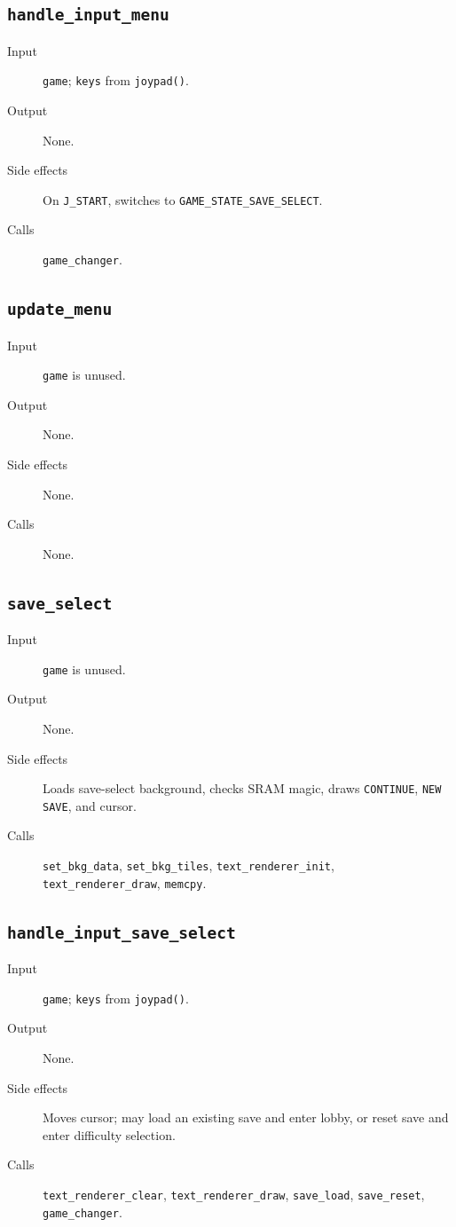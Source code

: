 \subsection*{\texttt{handle\_input\_menu}}
\begin{description}
  \item[Input] \texttt{game}; \texttt{keys} from \texttt{joypad()}.
  \item[Output] None.
  \item[Side effects] On \texttt{J\_START}, switches to \texttt{GAME\_STATE\_SAVE\_SELECT}.
  \item[Calls] \texttt{game\_changer}.
\end{description}

\subsection*{\texttt{update\_menu}}
\begin{description}
  \item[Input] \texttt{game} is unused.
  \item[Output] None.
  \item[Side effects] None.
  \item[Calls] None.
\end{description}

\subsection*{\texttt{save\_select}}
\begin{description}
  \item[Input] \texttt{game} is unused.
  \item[Output] None.
  \item[Side effects] Loads save-select background, checks SRAM magic, draws \texttt{CONTINUE}, \texttt{NEW SAVE}, and cursor.
  \item[Calls] \texttt{set\_bkg\_data}, \texttt{set\_bkg\_tiles}, \texttt{text\_renderer\_init}, \texttt{text\_renderer\_draw}, \texttt{memcpy}.
\end{description}

\subsection*{\texttt{handle\_input\_save\_select}}
\begin{description}
  \item[Input] \texttt{game}; \texttt{keys} from \texttt{joypad()}.
  \item[Output] None.
  \item[Side effects] Moves cursor; may load an existing save and enter lobby, or reset save and enter difficulty selection.
  \item[Calls] \texttt{text\_renderer\_clear}, \texttt{text\_renderer\_draw}, \texttt{save\_load}, \texttt{save\_reset}, \texttt{game\_changer}.
\end{description}

